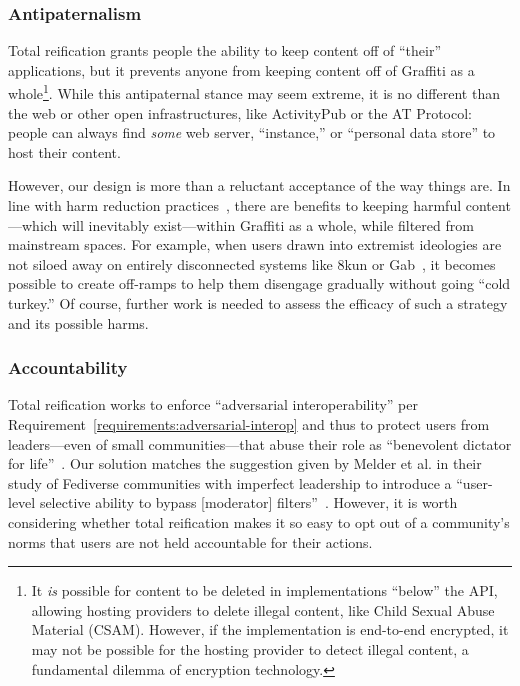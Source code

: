 \subsubsection{Antipaternalism}

Total reification grants people the ability to keep content off of ``their'' applications,
but it prevents anyone from keeping content off of Graffiti as a whole\footnote{%
It \emph{is} possible for content to be deleted in implementations ``below'' the API,
allowing hosting providers to delete illegal content,
like Child Sexual Abuse Material (CSAM).
However, if the implementation is end-to-end encrypted,
it may not be possible for the hosting provider to
detect illegal content,
a fundamental dilemma of encryption technology.
}.
While this antipaternal stance may seem extreme,
it is no different than the web or other open infrastructures,
like ActivityPub or the AT Protocol:
people can always find \emph{some}
web server, ``instance,''
or ``personal data store'' to host their content.

However, our design is more than a reluctant acceptance of the way things are.
In line with harm reduction practices~\expandafter{\expandafter\cite{harmreduction}},
there are benefits to keeping harmful content---which will inevitably
exist---within Graffiti as a whole, while filtered from mainstream spaces.
For example, when users drawn into extremist ideologies are not
siloed away on entirely disconnected systems
like 8kun or Gab~\cite{8kun,gab}, it becomes possible to create off-ramps
to help them disengage gradually without going ``cold turkey.''
Of course, further work is needed to assess the efficacy of
such a strategy and its possible harms.

\subsubsection{Accountability}

Total reification works to enforce ``adversarial interoperability''
per Requirement~{\ref{requirements:adversarial-interop}}
and thus to protect users from leaders---even of small communities---that abuse their role as
``benevolent dictator for life''~{\cite{governablespaces}}.
Our solution matches the suggestion given by Melder et al.
in their study of Fediverse communities with imperfect leadership
to introduce a ``user-level selective ability to bypass [moderator] filters''~{\cite{blocklistboundary}}.
However, it is worth considering whether total reification makes it so easy
to opt out of a community's norms that users are not held accountable for their actions.

